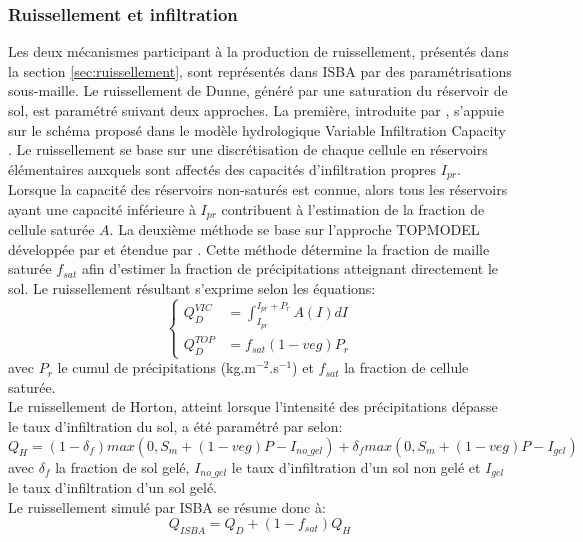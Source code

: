 \subsubsection{{\selectfont Ruissellement et infiltration}}

Les deux mécanismes participant à la production de ruissellement, présentés dans la section \ref{sec:ruissellement}, sont représentés dans ISBA par des paramétrisations sous-maille.
Le ruissellement de Dunne, généré par une saturation du réservoir de sol, est paramétré suivant deux approches. La première, introduite par \citet{habets1999}, s'appuie sur le schéma proposé dans le modèle hydrologique Variable Infiltration Capacity \citet[VIC,][]{dumenil1992}. Le ruissellement se base sur une discrétisation de chaque cellule en réservoirs élémentaires auxquels sont affectés des capacités d'infiltration propres $I_{pr}$. Lorsque la capacité des réservoirs non-saturés est connue, alors tous les réservoirs ayant une capacité inférieure à $I_{pr}$ contribuent à l'estimation de la fraction de cellule saturée $A$.
La deuxième méthode se base sur l'approche TOPMODEL développée par \citet{habets2001} et étendue par \citet{decharme2006}. Cette méthode détermine la fraction de maille saturée $f_{sat}$ afin d'estimer la fraction de précipitations atteignant directement le sol. 
Le ruissellement résultant s'exprime selon les équations:
%
\begin{equation}\label{eq_runoff}
\begin{cases} 
Q_{D}^{VIC}&= \int_{I_{pr}}^{I_{pr}+P_{r}} A(I)dI
\\
Q_{D}^{TOP}&= f_{sat}(1-veg)P_{r}
\end{cases}
\end{equation}
%
avec $P_{r}$ le cumul de précipitations (kg.m$^{-2}$.s$^{-1}$) et $f_{sat}$ la fraction de cellule saturée. \\

\noindent Le ruissellement de Horton, atteint lorsque l'intensité des précipitations dépasse le taux d'infiltration du sol, a été paramétré par \citet{decharme2006} selon:
\begin{equation}
Q_{H} = (1-\delta_{f})max(0,S_{m}+(1-veg)P - I_{no\_gel})+\delta_{f}max(0,S_{m}+(1-veg)P-I_{gel})
\end{equation}
avec $\delta_{f}$ la fraction de sol gelé, $I_{no\_gel}$ le taux d'infiltration d'un sol non gelé et  $I_{gel}$ le taux d'infiltration d'un sol gelé. \\

\noindent Le ruissellement simulé par ISBA se résume donc à:
\begin{equation}
Q_{ISBA}=Q_{D}+(1-f_{sat})Q_{H}
\end{equation}


